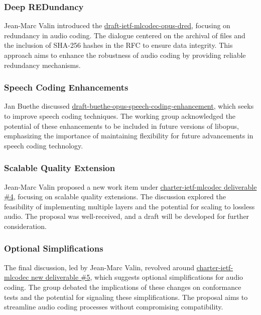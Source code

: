 \documentclass{article}
\begin{document}
\subsubsection{Deep REDundancy}
Jean-Marc Valin introduced the \href{https://datatracker.ietf.org/doc/html/draft-ietf-mlcodec-opus-dred}{draft-ietf-mlcodec-opus-dred}, focusing on redundancy in audio coding. The dialogue centered on the archival of files and the inclusion of SHA-256 hashes in the RFC to ensure data integrity. This approach aims to enhance the robustness of audio coding by providing reliable redundancy mechanisms.

\subsubsection{Speech Coding Enhancements}
Jan Buethe discussed \href{https://datatracker.ietf.org/doc/html/draft-buethe-opus-speech-coding-enhancement}{draft-buethe-opus-speech-coding-enhancement}, which seeks to improve speech coding techniques. The working group acknowledged the potential of these enhancements to be included in future versions of libopus, emphasizing the importance of maintaining flexibility for future advancements in speech coding technology.

\subsubsection{Scalable Quality Extension}
Jean-Marc Valin proposed a new work item under \href{https://datatracker.ietf.org/doc/html/charter-ietf-mlcodec}{charter-ietf-mlcodec deliverable \#4}, focusing on scalable quality extensions. The discussion explored the feasibility of implementing multiple layers and the potential for scaling to lossless audio. The proposal was well-received, and a draft will be developed for further consideration.

\subsubsection{Optional Simplifications}
The final discussion, led by Jean-Marc Valin, revolved around \href{https://datatracker.ietf.org/doc/html/charter-ietf-mlcodec}{charter-ietf-mlcodec new deliverable \#5}, which suggests optional simplifications for audio coding. The group debated the implications of these changes on conformance tests and the potential for signaling these simplifications. The proposal aims to streamline audio coding processes without compromising compatibility.
\end{document}
